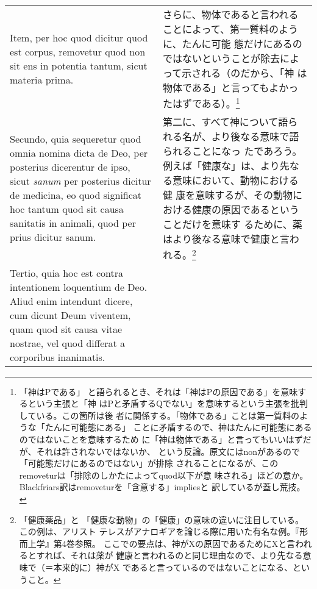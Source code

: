 \documentclass[10pt]{jsarticle} %
\begin{document}
\begin{longtable}{p{21em}p{21em}}
\\

Item, per hoc quod dicitur quod est corpus, removetur
quod non sit ens in potentia tantum, sicut materia prima.


&

さらに、物体であると言われることによって、第一質料のように、たんに可能
態だけにあるのではないということが除去によって示される（のだから、「神
は物体である」と言ってもよかったはずである）。\footnote{「神はPである」
と語られるとき、それは「神はPの原因である」を意味するという主張と「神
はPと矛盾するQでない」を意味するという主張を批判している。この箇所は後
者に関係する。「物体である」ことは第一質料のような「たんに可能態にある」
ことに矛盾するので、神はたんに可能態にあるのではないことを意味するため
に「神は物体である」と言ってもいいはずだが、それは許されないではないか、
という反論。原文にはnonがあるので「可能態だけにあるのではない」が排除
されることになるが、このremoveturは「排除のしかたによってquod以下が意
味される」ほどの意か。Blackfriars訳はremoveturを「含意する」impliesと
訳しているが蓋し荒技。}

\\

Secundo, quia
sequeretur quod omnia nomina dicta de Deo, per posterius dicerentur de
ipso, sicut {\it sanum} per posterius dicitur de medicina, eo quod significat
hoc tantum quod sit causa sanitatis in animali, quod per prius dicitur
sanum. 




&

第二に、すべて神について語られる名が、より後なる意味で語られることになっ
たであろう。例えば「健康な」は、より先なる意味において、動物における健
康を意味するが、その動物における健康の原因であるということだけを意味す
るために、薬はより後なる意味で健康と言われる。\footnote{「健康薬品」と
「健康な動物」の「健康」の意味の違いに注目している。この例は、アリスト
テレスがアナロギアを論じる際に用いた有名な例。『形而上学』第4巻参照。
ここでの要点は、神がXの原因であるためにXと言われるとすれば、それは薬が
健康と言われるのと同じ理由なので、より先なる意味で（＝本来的に）神がX
であると言っているのではないことになる、ということ。}

\\

Tertio, quia hoc est contra intentionem loquentium de Deo. Aliud
enim intendunt dicere, cum dicunt Deum viventem, quam quod sit causa
vitae nostrae, vel quod differat a corporibus inanimatis. 

&


\end{longtable}
\end{document}
